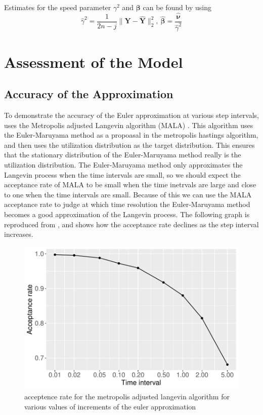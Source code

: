 Estimates for the speed parameter $\gamma^2$ and $\pmb{\beta}$ can be found by using
$$
\hat{\gamma}^2 = \frac{1}{2n-j} \lVert \mathbf{Y} - \mathbf{\hat{Y}} \rVert^2_2, \ 
\pmb{\hat{\beta}} = \frac{\pmb{\hat{\nu}}}{\hat{\gamma}^2}
\label{eq: michelot estimates}
$$



\section{Assessment of the Model}

\subsection{Accuracy of the Approximation}
To demonstrate the accuracy of the Euler approximation at various step intervals, \cite{michelot_langevin_2019} uses the Metropolis adjusted Langevin algorithm (MALA) \cite{roberts_exponential_1996}. This algorithm uses the Euler-Maruyama method as a propoasal in the metropolis hastings algorithm, and then uses the utilization distribution as the target distribution. This ensures that the stationary distribution of the Euler-Maruyama method really is the utilization distribution. The Euler-Maruyama method only approximates the Langevin process when the time intervals are small, so we should expect the acceptance rate of MALA to be small when the time inetrvals are large and close to one when the time intervals are small. Because of this we can use the MALA acceptance rate to judge at which time resolution the Euler-Maruyama method becomes a good approximation of the Langevin process. The following graph is reproduced from \cite{michelot_langevin_2019}, and shows how the acceptance rate declines as the step interval increases.

\begin{figure}[H]
    \centering
    \includegraphics[width=\linewidth]{Images/example1/MALArates.pdf}
    \caption[example 1 covariates]{acceptence rate for the metropolis adjusted langevin algorithm for various values of increments of the euler approximation}
    \label{fig:MALA}
\end{figure}


